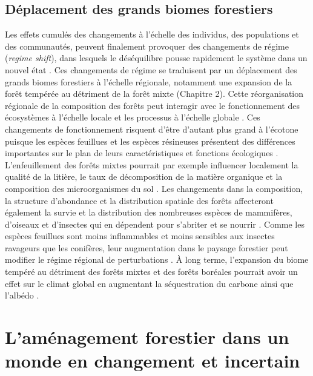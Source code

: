 \hypertarget{duxe9placement-des-grands-biomes-forestiers}{%
\subsection{Déplacement des grands biomes
forestiers}\label{duxe9placement-des-grands-biomes-forestiers}}

Les effets cumulés des changements à l'échelle des individus, des
populations et des communautés, peuvent finalement provoquer des
changements de régime (\emph{regime shift}), dans lesquels le
déséquilibre pousse rapidement le système dans un nouvel état
\citep{scheffer_catastrophic_2001}. Ces changements de régime se
traduisent par un déplacement des grands biomes forestiers à l'échelle
régionale, notamment une expansion de la forêt tempérée au détriment de
la forêt mixte (Chapitre 2). Cette réorganisation régionale de la
composition des forêts peut interagir avec le fonctionnement des
écosystèmes à l'échelle locale et les processus à l'échelle globale
\citep[\emph{cross-scale
interaction};][]{peters_crossscale_2007, messier_managing_2013}. Ces
changements de fonctionnement risquent d'être d'autant plus grand à
l'écotone puisque les espèces feuillues et les espèces résineuses
présentent des différences importantes sur le plan de leurs
caractéristiques et fonctions écologiques
\citep{wardle_terrestrial_2011}. L'enfeuillement des forêts mixtes
pourrait par exemple influencer localement la qualité de la litière, le
taux de décomposition de la matière organique et la composition des
microorganismes du sol
\citep{laganiere_how_2010, legare_influence_2005}. Les changements dans
la composition, la structure d'abondance et la distribution spatiale des
forêts affecteront également la survie et la distribution des nombreuses
espèces de mammifères, d'oiseaux et d'insectes qui en dépendent pour
s'abriter et se nourrir \citep{friggens_effects_2018}. Comme les espèces
feuillues sont moins inflammables et moins sensibles aux insectes
ravageurs que les conifères, leur augmentation dans le paysage forestier
peut modifier le régime régional de perturbations
\citep{terrier_potential_2013, mffp_insectes_2018}. À long terme,
l'expansion du biome tempéré au détriment des forêts mixtes et des
forêts boréales pourrait avoir un effet sur le climat global en
augmentant la séquestration du carbone \citep{thurner_carbon_2014} ainsi
que l'albédo \citep{anderson_biophysical_2011}.

\hypertarget{lamuxe9nagement-forestier-dans-un-monde-en-changement-et-incertain}{%
\section{L'aménagement forestier dans un monde en changement et
incertain}\label{lamuxe9nagement-forestier-dans-un-monde-en-changement-et-incertain}}

